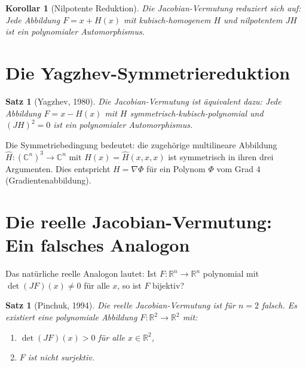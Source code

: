 \documentclass[12pt,a4paper]{amsart}
\newtheorem{satz}[theorem]{Satz}
\newtheorem{korollar}[theorem]{Korollar}
\theoremstyle{definition}
\theoremstyle{remark}
\begin{document}
\begin{korollar}[Nilpotente Reduktion]\label{kor:nilpotent}
Die Jacobian-Vermutung reduziert sich auf: Jede Abbildung $F = x + H(x)$ mit
kubisch-homogenem $H$ und nilpotentem $JH$ ist ein polynomialer Automorphismus.
\end{korollar}

\section{Die Yagzhev-Symmetriereduktion}
\label{abschn:yagzhev}

\begin{satz}[Yagzhev, 1980]\label{satz:yagzhev}
Die Jacobian-Vermutung ist äquivalent dazu: Jede Abbildung $F = x - H(x)$ mit
$H$ symmetrisch-kubisch-polynomial und $(JH)^2 = 0$ ist ein polynomialer Automorphismus.
\end{satz}

Die Symmetriebedingung bedeutet: die zugehörige multilineare Abbildung
$\hat{H} \colon (\mathbb{C}^n)^3 \to \mathbb{C}^n$ mit $H(x) = \hat{H}(x,x,x)$
ist symmetrisch in ihren drei Argumenten. Dies entspricht $H = \nabla \Phi$ für
ein Polynom $\Phi$ vom Grad $4$ (Gradientenabbildung).

\section{Die reelle Jacobian-Vermutung: Ein falsches Analogon}
\label{abschn:real}

Das natürliche reelle Analogon lautet: Ist $F \colon \mathbb{R}^n \to \mathbb{R}^n$
polynomial mit $\det(JF)(x) \neq 0$ für alle $x$, so ist $F$ bijektiv?

\begin{satz}[Pinchuk, 1994]\label{satz:pinchuk}
Die reelle Jacobian-Vermutung ist für $n = 2$ \emph{falsch}. Es existiert eine
polynomiale Abbildung $F \colon \mathbb{R}^2 \to \mathbb{R}^2$ mit:
\begin{enumerate}[label=(\roman*)]
  \item $\det(JF)(x) > 0$ für alle $x \in \mathbb{R}^2$,
  \item $F$ ist nicht surjektiv.
\end{enumerate}
\end{satz}
\end{document}
